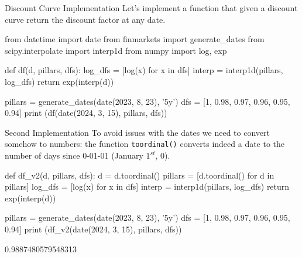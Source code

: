 \documentclass{beamer}
\begin{document}
\begin{frame}[fragile]{Discount Curve Implementation}
Let's implement a function that given a discount curve return the discount factor at any date.
\begin{ipython}
from datetime import date
from finmarkets import generate_dates
from scipy.interpolate import interp1d
from numpy import log, exp

def df(d, pillars, dfs):
    log_dfs = [log(x) for x in dfs]
    interp = interp1d(pillars, log_dfs)
    return exp(interp(d))
    
pillars = generate_dates(date(2023, 8, 23), '5y')
dfs = [1, 0.98, 0.97, 0.96, 0.95, 0.94]
print (df(date(2024, 3, 15), pillars, dfs))
\end{ipython}
\end{frame}

\begin{frame}[fragile]{Second Implementation}
To avoid issues with the dates we need to convert somehow to numbers: the function \texttt{toordinal()} converts indeed a date to the number of days since 0-01-01 (January $1^{st}$, 0).
\begin{ipython}
def df_v2(d, pillars, dfs):
    d = d.toordinal()
    pillars = [d.toordinal() for d in pillars]
    log_dfs = [log(x) for x in dfs]
    interp = interp1d(pillars, log_dfs)
    return exp(interp(d))
    
pillars = generate_dates(date(2023, 8, 23), '5y')
dfs = [1, 0.98, 0.97, 0.96, 0.95, 0.94]
print (df_v2(date(2024, 3, 15), pillars, dfs))
\end{ipython}
\begin{ioutput}
0.9887480579548313
\end{ioutput}
\end{frame}
\end{document}
